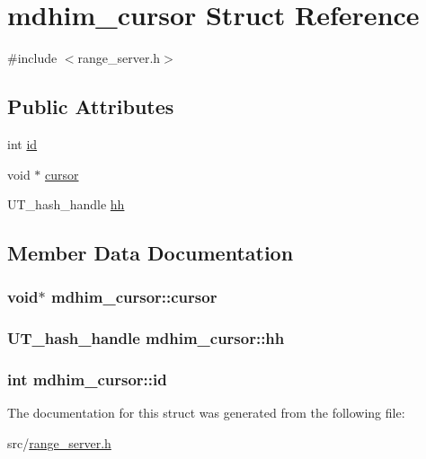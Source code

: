 \hypertarget{structmdhim__cursor}{\section{mdhim\-\_\-cursor Struct Reference}
\label{d8/d3b/structmdhim__cursor}
}


{\ttfamily \#include $<$range\-\_\-server.\-h$>$}

\subsection*{Public Attributes}
\begin{DoxyCompactItemize}
\item 
int \hyperlink{structmdhim__cursor_a5d523640919b70b9b4427b9db8ba2b43}{id}
\item 
void $\ast$ \hyperlink{structmdhim__cursor_a71f00460e78bd91613d5173f64b7c41f}{cursor}
\item 
U\-T\-\_\-hash\-\_\-handle \hyperlink{structmdhim__cursor_a528996901a02f2511c251b3da2b812a1}{hh}
\end{DoxyCompactItemize}


\subsection{Member Data Documentation}
\hypertarget{structmdhim__cursor_a71f00460e78bd91613d5173f64b7c41f}{
\subsubsection[{cursor}]{\setlength{\rightskip}{0pt plus 5cm}void$\ast$ mdhim\-\_\-cursor\-::cursor}}\label{d8/d3b/structmdhim__cursor_a71f00460e78bd91613d5173f64b7c41f}
\hypertarget{structmdhim__cursor_a528996901a02f2511c251b3da2b812a1}{
\subsubsection[{hh}]{\setlength{\rightskip}{0pt plus 5cm}U\-T\-\_\-hash\-\_\-handle mdhim\-\_\-cursor\-::hh}}\label{d8/d3b/structmdhim__cursor_a528996901a02f2511c251b3da2b812a1}
\hypertarget{structmdhim__cursor_a5d523640919b70b9b4427b9db8ba2b43}{
\subsubsection[{id}]{\setlength{\rightskip}{0pt plus 5cm}int mdhim\-\_\-cursor\-::id}}\label{d8/d3b/structmdhim__cursor_a5d523640919b70b9b4427b9db8ba2b43}


The documentation for this struct was generated from the following file\-:\begin{DoxyCompactItemize}
\item 
src/\hyperlink{range__server_8h}{range\-\_\-server.\-h}\end{DoxyCompactItemize}
